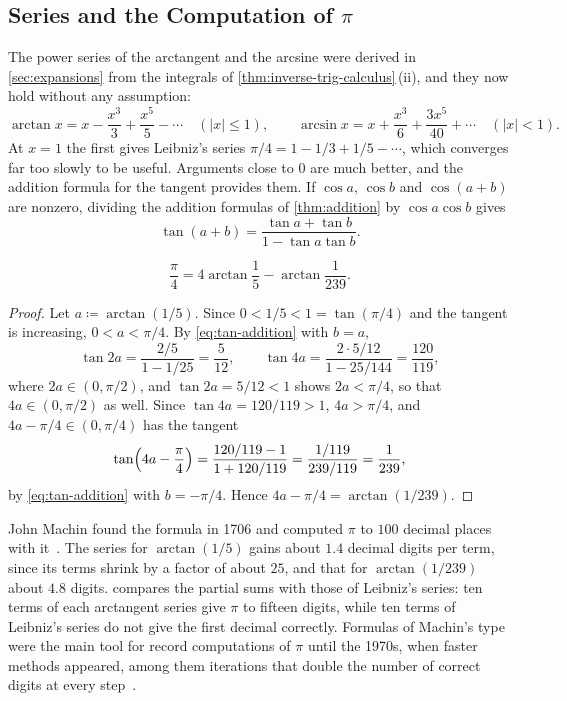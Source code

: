 \subsection{Series and the Computation of \texorpdfstring{$\pi$}{pi}}

The power series of the arctangent and the arcsine were derived in \cref{sec:expansions} from the integrals of \cref{thm:inverse-trig-calculus}\,(ii), and they now hold without any assumption:
\[
\arctan x=x-\frac{x^3}3+\frac{x^5}5-\cdots\quad(|x|\le1),\qquad\arcsin x=x+\frac{x^3}6+\frac{3x^5}{40}+\cdots\quad(|x|<1).
\]
At $x=1$ the first gives Leibniz's series $\pi/4=1-1/3+1/5-\cdots$, which converges far too slowly to be useful. Arguments close to $0$ are much better, and the addition formula for the tangent provides them. If $\cos a$, $\cos b$ and $\cos(a+b)$ are nonzero, dividing the addition formulas of \cref{thm:addition} by $\cos a\cos b$ gives
\begin{equation}
\tan(a+b)=\frac{\tan a+\tan b}{1-\tan a\tan b} .
\label{eq:tan-addition}
\end{equation}

\begin{proposition}
\label{prop:machin}
\[
\frac\pi4=4\arctan\frac15-\arctan\frac1{239} .
\]
\end{proposition}

\begin{proof}
Let $a\coloneqq\arctan(1/5)$. Since $0<1/5<1=\tan(\pi/4)$ and the tangent is increasing, $0<a<\pi/4$. By \eqref{eq:tan-addition} with $b=a$,
\[
\tan2a=\frac{2/5}{1-1/25}=\frac5{12},\qquad\tan4a=\frac{2\cdot5/12}{1-25/144}=\frac{120}{119} ,
\]
where $2a\in(0,\pi/2)$, and $\tan2a=5/12<1$ shows $2a<\pi/4$, so that $4a\in(0,\pi/2)$ as well. Since $\tan4a=120/119>1$, $4a>\pi/4$, and $4a-\pi/4\in(0,\pi/4)$ has the tangent
\[
\tan\Bigl(4a-\frac\pi4\Bigr)=\frac{120/119-1}{1+120/119}=\frac{1/119}{239/119}=\frac1{239} ,
\]
by \eqref{eq:tan-addition} with $b=-\pi/4$. Hence $4a-\pi/4=\arctan(1/239)$.
\end{proof}

John Machin found the formula in 1706 and computed $\pi$ to $100$ decimal places with it~\cite{berggren2004pi}. The series for $\arctan(1/5)$ gains about $1.4$ decimal digits per term, since its terms shrink by a factor of about $25$, and that for $\arctan(1/239)$ about $4.8$ digits.  compares the partial sums with those of Leibniz's series: ten terms of each arctangent series give $\pi$ to fifteen digits, while ten terms of Leibniz's series do not give the first decimal correctly. Formulas of Machin's type were the main tool for record computations of $\pi$ until the 1970s, when faster methods appeared, among them iterations that double the number of correct digits at every step~\cite{berggren2004pi}.

